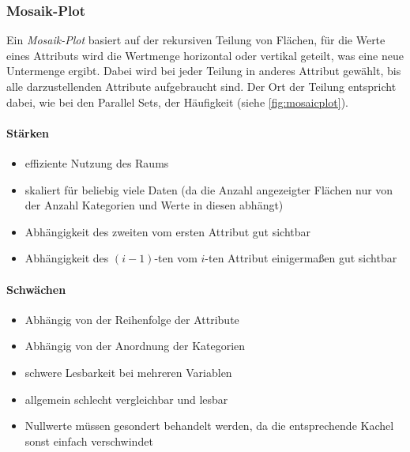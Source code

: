 			\subsubsection{Mosaik-Plot}
				Ein \emph{Mosaik-Plot} basiert auf der rekursiven Teilung von Flächen, \dh für die Werte eines Attributs wird die Wertmenge horizontal oder vertikal geteilt, was eine neue Untermenge ergibt. Dabei wird bei jeder Teilung in anderes Attribut gewählt, bis alle darzustellenden Attribute aufgebraucht sind. Der Ort der Teilung entspricht dabei, wie bei den Parallel Sets, der Häufigkeit (siehe \autoref{fig:mosaicplot}).

				\paragraph{Stärken}
				\begin{itemize}
					\item effiziente Nutzung des Raums
					\item skaliert für beliebig viele Daten (da die Anzahl angezeigter Flächen nur von der Anzahl Kategorien und Werte in diesen abhängt)
					\item Abhängigkeit des zweiten vom ersten Attribut gut sichtbar
					\item Abhängigkeit des \((i - 1)\)-ten vom \(i\)-ten Attribut einigermaßen gut sichtbar
				\end{itemize}

				\paragraph{Schwächen}
				\begin{itemize}
					\item Abhängig von der Reihenfolge der Attribute
					\item Abhängig von der Anordnung der Kategorien
					\item schwere Lesbarkeit bei mehreren Variablen
					\item allgemein schlecht vergleichbar und lesbar
					\item Nullwerte müssen gesondert behandelt werden, da die entsprechende Kachel sonst einfach verschwindet
				\end{itemize}

